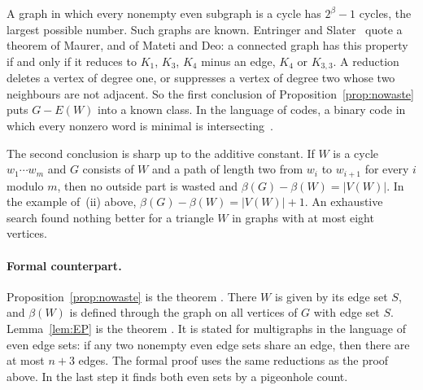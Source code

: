 A graph in which every nonempty even subgraph is a cycle has $2^{\beta}-1$ cycles, the largest
possible number. Such graphs are known. Entringer and Slater~\cite[Theorem~1]{ES} quote a theorem of
Maurer, and of Mateti and Deo: a connected graph has this property if and only if it reduces to
$K_1$, $K_3$, $K_4$ minus an edge, $K_4$ or $K_{3,3}$. A reduction deletes a vertex of degree one,
or suppresses a vertex of degree two whose two neighbours are not adjacent. So the first conclusion of Proposition~\ref{prop:nowaste}
puts $G-E(W)$ into a known class. In the language of codes, a binary code in which every nonzero
word is minimal is intersecting~\cite[\S2]{AACST}.

The second conclusion is sharp up to the additive constant. If $W$ is a cycle $w_1\cdots w_m$ and
$G$ consists of $W$ and a path of length two from $w_i$ to $w_{i+1}$ for every $i$ modulo $m$, then
no outside part is wasted and $\beta(G)-\beta(W)=|V(W)|$. In the example of~(ii) above,
$\beta(G)-\beta(W)=|V(W)|+1$. An exhaustive search found nothing better for a triangle $W$ in
graphs with at most eight vertices.

\paragraph{Formal counterpart.}
Proposition~\ref{prop:nowaste} is the theorem . There $W$ is given by its edge
set $S$, and $\beta(W)$ is defined through the graph on all vertices of $G$ with edge set $S$.
Lemma~\ref{lem:EP} is the theorem . It is stated
for multigraphs in the language of even edge sets: if any two nonempty even edge sets share an
edge, then there are at most $n+3$ edges. The formal proof uses the same reductions as the proof
above. In the last step it finds both even sets by a pigeonhole count.
